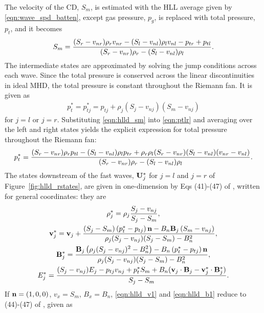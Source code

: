 The velocity of the CD, $S_m$, is estimated with the HLL average given by \eqref{eqn:wave_spd_batten}, except gas pressure, $p_g$, is replaced with total pressure, $p_t$, and it becomes  
\begin{gather}
\label{eqn:hlld_sm}
S_m = \frac{(S_r - v_{nr})\rho_r v_{nr} - (S_l - v_{nl})\rho_l v_{nl} - p_{tr} + p_{tl} }
{(S_r - v_{nr})\rho_r  - (S_l - v_{nl})\rho_l}.
\end{gather}     
The intermediate states are approximated by solving the jump conditions across each wave.  Since the total pressure is conserved across the linear discontinuities in ideal MHD, the total pressure is constant throughout the Riemann fan.  It is given as 
\begin{gather}
\label{eqn:ptlr}
p_{t}^* = p_{tj}^* = p_{tj} + \rho_j (S_j - v_{nj})(S_m - v_{nj})
\end{gather}
for $j=l$ or $j=r$.  Substituting \eqref{eqn:hlld_sm} into \eqref{eqn:ptlr} and averaging over the left and right states yields the explicit expression for total pressure throughout the Riemann fan:
\begin{gather}
\label{eqn:hlld_pt1}
p^*_{t} = \frac{(S_r - v_{nr})\rho_r p_{tl} - (S_l - v_{nl})\rho_l p_{tr} 
          + \rho_r\rho_l(S_r - v_{nr})(S_l - v_{nl})(v_{nr} - v_{nl})}{(S_r - v_{nr})\rho_r - (S_l - v_{nl})\rho_l}.
\end{gather} 
 The states downstream of the fast waves, $\mathbf{U}^*_j$ for $j=l$ and $j=r$ of Figure~\ref{fig:hlld_rstates}, are given in one-dimension by Eqs (41)-(47) of \citep{Miyoshi:2005}, written for general coordinates: they are
\begin{gather}
\label{eqn:hlld_d1}
\rho^*_j = \rho_j \frac{S_j - v_{nj}}{S_j - S_m} , \\
\label{eqn:hlld_v1}
\mathbf{v}^*_{j} = \mathbf{v}_{j} + \frac{\left(S_j - S_m\right)\left(p_{t}^* - p_{tj}\right)\mathbf{n} 
  - B_n\mathbf{B}_{j} \left(S_m - v_{nj}\right) }
               {\rho_j(S_j - v_{nj})(S_j - S_m) - B_n^2} , \\
\label{eqn:hlld_b1}
\mathbf{B}^*_{j} = \frac{\mathbf{B}_{j} \left(\rho_j(S_j - v_{nj})^2 - B_n^2\right) 
  - B_n\left(p_{t}^* - p_{tj}\right)\mathbf{n}}
                {\rho_j(S_j - v_{nj})(S_j - S_m) - B_n^2} , \\
\label{eqn:hlld_en1}
E^*_j = \frac{(S_j - v_{nj})E_j - p_{tj}v_{nj} + p^*_{t}S_m + B_n(\mathbf{v}_{j}\cdot\mathbf{B}_{j} 
        - \mathbf{v}^*_{j}\cdot\mathbf{B}^*_{j})}{S_j - S_m} .
\end{gather}
If $\mathbf{n} = (1,0,0)$, $v_x = S_m$, $B_x = B_n$, \eqref{eqn:hlld_v1} and \eqref{eqn:hlld_b1} reduce to (44)-(47) of \citep{Miyoshi:2005}, given as  
